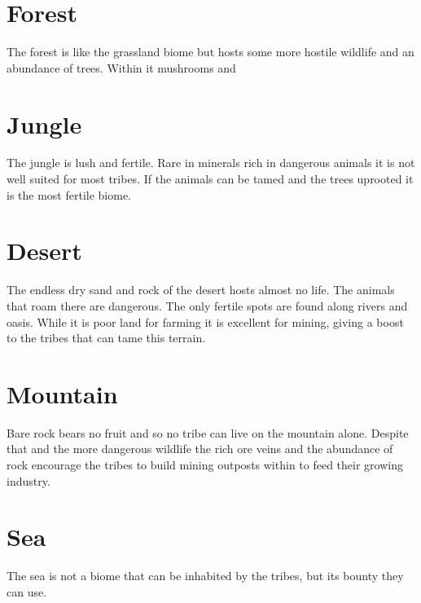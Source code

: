\section{Forest}
The forest is like the grassland biome but hosts some more hostile wildlife and
an abundance of trees. Within it mushrooms and

\section{Jungle}
The jungle is lush and fertile. Rare in minerals rich in dangerous animals it
is not well suited for most tribes. If the animals can be tamed and the trees
uprooted it is the most fertile biome.

\section{Desert}
The endless dry sand and rock of the desert hosts almost no life. The animals
that roam there are dangerous. The only fertile spots are found along rivers
and oasis. While it is poor land for farming it is excellent for mining, giving
a boost to the tribes that can tame this terrain.

\section{Mountain}
Bare rock bears no fruit and so no tribe can live on the mountain alone.
Despite that and the more dangerous wildlife the rich ore veins and the
abundance of rock encourage the tribes to build mining outposts within to feed
their growing industry.

\section{Sea}
The sea is not a biome that can be inhabited by the tribes, but its bounty they
can use.
